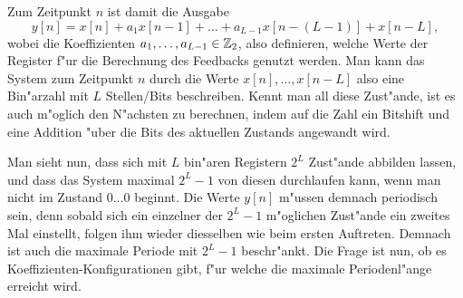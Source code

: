 Zum Zeitpunkt $n$ ist damit die Ausgabe
\[
y[n] 
    = x[n] 
      + a_1 x[n-1] 
      + \ldots 
      + a_{L-1} x[n - (L-1)] 
      + x[n-L],
\]
wobei die Koeffizienten $a_1, \ldots, a_{L-1} \in \mathbb{Z}_2$, also definieren, welche Werte der Register f"ur die Berechnung des Feedbacks genutzt werden.
Man kann das System zum Zeitpunkt $n$ durch die Werte $x[n], \ldots, x[n-L]$ also eine Bin"arzahl mit $L$ Stellen/Bits beschreiben. 
Kennt man all diese Zust"ande, ist es auch m"oglich den N"achsten zu berechnen, indem auf die Zahl ein Bitshift und eine  Addition "uber die Bits des aktuellen Zustands angewandt wird.

Man sieht nun, dass sich mit $L$ bin"aren Registern $2^L$ Zust"ande abbilden lassen, und dass das System maximal $2^L-1$ von diesen durchlaufen kann, wenn man nicht im Zustand $0\ldots 0$ beginnt.
Die Werte $y[n]$ m"ussen demnach periodisch sein, denn sobald sich ein einzelner der $2^L-1$ m"oglichen Zust"ande ein zweites Mal einstellt, folgen ihm wieder diesselben wie beim ersten Auftreten.
Demnach ist auch die maximale Periode mit $2^L-1$ beschr"ankt.
Die Frage ist nun, ob es Koeffizienten-Konfigurationen gibt, f"ur welche die maximale Periodenl"ange erreicht wird.

